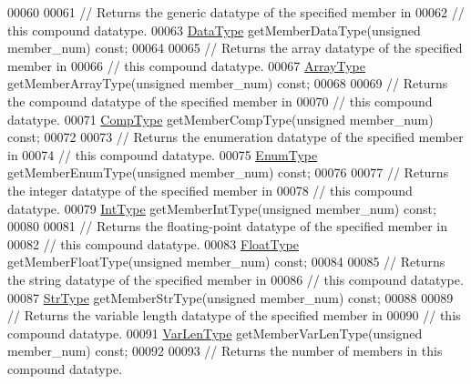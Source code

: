 \begin{DoxyCode}
00060 
00061         \textcolor{comment}{// Returns the generic datatype of the specified member in}
00062         \textcolor{comment}{// this compound datatype.}
00063         \hyperlink{class_h5_1_1_data_type}{DataType} getMemberDataType(\textcolor{keywordtype}{unsigned} member\_num) \textcolor{keyword}{const};
00064 
00065         \textcolor{comment}{// Returns the array datatype of the specified member in}
00066         \textcolor{comment}{// this compound datatype.}
00067         \hyperlink{class_h5_1_1_array_type}{ArrayType} getMemberArrayType(\textcolor{keywordtype}{unsigned} member\_num) \textcolor{keyword}{const};
00068 
00069         \textcolor{comment}{// Returns the compound datatype of the specified member in}
00070         \textcolor{comment}{// this compound datatype.}
00071         \hyperlink{class_h5_1_1_comp_type}{CompType} getMemberCompType(\textcolor{keywordtype}{unsigned} member\_num) \textcolor{keyword}{const};
00072 
00073         \textcolor{comment}{// Returns the enumeration datatype of the specified member in}
00074         \textcolor{comment}{// this compound datatype.}
00075         \hyperlink{class_h5_1_1_enum_type}{EnumType} getMemberEnumType(\textcolor{keywordtype}{unsigned} member\_num) \textcolor{keyword}{const};
00076 
00077         \textcolor{comment}{// Returns the integer datatype of the specified member in}
00078         \textcolor{comment}{// this compound datatype.}
00079         \hyperlink{class_h5_1_1_int_type}{IntType} getMemberIntType(\textcolor{keywordtype}{unsigned} member\_num) \textcolor{keyword}{const};
00080 
00081         \textcolor{comment}{// Returns the floating-point datatype of the specified member in}
00082         \textcolor{comment}{// this compound datatype.}
00083         \hyperlink{class_h5_1_1_float_type}{FloatType} getMemberFloatType(\textcolor{keywordtype}{unsigned} member\_num) \textcolor{keyword}{const};
00084 
00085         \textcolor{comment}{// Returns the string datatype of the specified member in}
00086         \textcolor{comment}{// this compound datatype.}
00087         \hyperlink{class_h5_1_1_str_type}{StrType} getMemberStrType(\textcolor{keywordtype}{unsigned} member\_num) \textcolor{keyword}{const};
00088 
00089         \textcolor{comment}{// Returns the variable length datatype of the specified member in}
00090         \textcolor{comment}{// this compound datatype.}
00091         \hyperlink{class_h5_1_1_var_len_type}{VarLenType} getMemberVarLenType(\textcolor{keywordtype}{unsigned} member\_num) \textcolor{keyword}{const};
00092 
00093         \textcolor{comment}{// Returns the number of members in this compound datatype.}

\end{DoxyCode}
